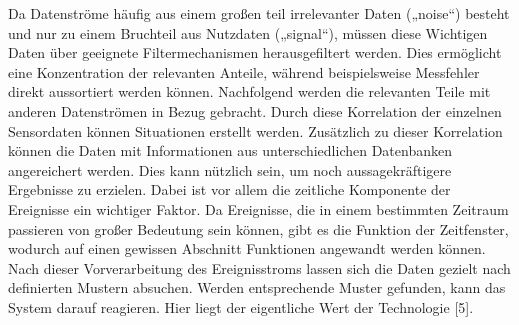 Da Datenströme häufig aus einem großen teil irrelevanter Daten („noise“) besteht und nur zu einem Bruchteil aus Nutzdaten („signal“), müssen diese Wichtigen Daten über geeignete Filtermechanismen herausgefiltert werden. Dies ermöglicht eine Konzentration der relevanten Anteile, während beispielsweise Messfehler direkt aussortiert werden können. Nachfolgend werden die relevanten Teile mit anderen Datenströmen in Bezug gebracht. Durch diese Korrelation der einzelnen Sensordaten können Situationen erstellt werden. Zusätzlich zu dieser Korrelation können die Daten mit Informationen aus unterschiedlichen Datenbanken angereichert werden. Dies kann nützlich sein, um noch aussagekräftigere Ergebnisse zu erzielen. Dabei ist vor allem die zeitliche Komponente der Ereignisse ein wichtiger Faktor. Da Ereignisse, die in einem bestimmten Zeitraum passieren von großer Bedeutung sein können, gibt es die Funktion der Zeitfenster, wodurch auf einen gewissen Abschnitt Funktionen angewandt werden können. Nach dieser Vorverarbeitung des Ereignisstroms lassen sich die Daten gezielt nach definierten Mustern absuchen. Werden entsprechende Muster gefunden, kann das System darauf reagieren. Hier liegt der eigentliche Wert der Technologie [5].



\ifCLASSOPTIONcaptionsoff
  \newpage
\fi